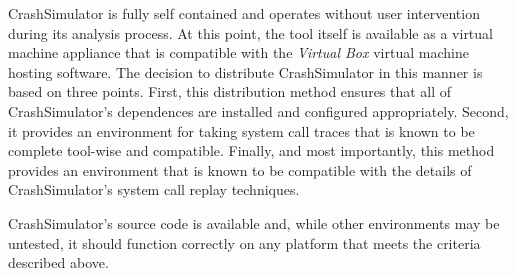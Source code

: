     CrashSimulator is fully self contained and operates without user
    intervention during its analysis process. At this point, the tool 
    itself is available as a virtual machine appliance that is compatible with the
    \emph{Virtual Box} virtual machine hosting software.  The decision to
    distribute CrashSimulator in this manner is based on three points.  First, this
    distribution method ensures that all of CrashSimulator's dependences are
    installed and configured appropriately.  Second, it provides an
    environment for taking system call traces that is known to be complete
    tool-wise and compatible.  Finally, and most importantly,
    this method provides an environment that is known to be compatible with the
    details of CrashSimulator's system call replay techniques.

    CrashSimulator's source code is available and, while other environments may
    be untested, it should function correctly on any platform that meets the
    criteria described above.
